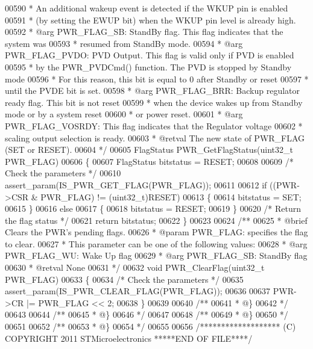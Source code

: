 \begin{DoxyCode}
00590 \textcolor{comment}{  *                  An additional wakeup event is detected if the WKUP pin is enabled }
00591 \textcolor{comment}{  *                  (by setting the EWUP bit) when the WKUP pin level is already high.  }
00592 \textcolor{comment}{  *            @arg PWR\_FLAG\_SB: StandBy flag. This flag indicates that the system was}
00593 \textcolor{comment}{  *                  resumed from StandBy mode.    }
00594 \textcolor{comment}{  *            @arg PWR\_FLAG\_PVDO: PVD Output. This flag is valid only if PVD is enabled }
00595 \textcolor{comment}{  *                  by the PWR\_PVDCmd() function. The PVD is stopped by Standby mode }
00596 \textcolor{comment}{  *                  For this reason, this bit is equal to 0 after Standby or reset}
00597 \textcolor{comment}{  *                  until the PVDE bit is set.}
00598 \textcolor{comment}{  *            @arg PWR\_FLAG\_BRR: Backup regulator ready flag. This bit is not reset }
00599 \textcolor{comment}{  *                  when the device wakes up from Standby mode or by a system reset }
00600 \textcolor{comment}{  *                  or power reset.  }
00601 \textcolor{comment}{  *            @arg PWR\_FLAG\_VOSRDY: This flag indicates that the Regulator voltage }
00602 \textcolor{comment}{  *                 scaling output selection is ready. }
00603 \textcolor{comment}{  * @retval The new state of PWR\_FLAG (SET or RESET).}
00604 \textcolor{comment}{  */}
00605 FlagStatus PWR_GetFlagStatus(uint32\_t PWR\_FLAG)
00606 \{
00607   FlagStatus bitstatus = RESET;
00608 
00609   \textcolor{comment}{/* Check the parameters */}
00610   assert_param(IS\_PWR\_GET\_FLAG(PWR\_FLAG));
00611 
00612   \textcolor{keywordflow}{if} ((PWR->CSR & PWR\_FLAG) != (uint32\_t)RESET)
00613   \{
00614     bitstatus = SET;
00615   \}
00616   \textcolor{keywordflow}{else}
00617   \{
00618     bitstatus = RESET;
00619   \}
00620   \textcolor{comment}{/* Return the flag status */}
00621   \textcolor{keywordflow}{return} bitstatus;
00622 \}
00623 
00624 \textcolor{comment}{/**}
00625 \textcolor{comment}{  * @brief  Clears the PWR's pending flags.}
00626 \textcolor{comment}{  * @param  PWR\_FLAG: specifies the flag to clear.}
00627 \textcolor{comment}{  *          This parameter can be one of the following values:}
00628 \textcolor{comment}{  *            @arg PWR\_FLAG\_WU: Wake Up flag}
00629 \textcolor{comment}{  *            @arg PWR\_FLAG\_SB: StandBy flag}
00630 \textcolor{comment}{  * @retval None}
00631 \textcolor{comment}{  */}
00632 \textcolor{keywordtype}{void} PWR_ClearFlag(uint32\_t PWR\_FLAG)
00633 \{
00634   \textcolor{comment}{/* Check the parameters */}
00635   assert_param(IS\_PWR\_CLEAR\_FLAG(PWR\_FLAG));
00636 
00637   PWR->CR |=  PWR\_FLAG << 2;
00638 \}
00639 
00640 \textcolor{comment}{/**}
00641 \textcolor{comment}{  * @\}}
00642 \textcolor{comment}{  */}
00643 
00644 \textcolor{comment}{/**}
00645 \textcolor{comment}{  * @\}}
00646 \textcolor{comment}{  */}
00647 
00648 \textcolor{comment}{/**}
00649 \textcolor{comment}{  * @\}}
00650 \textcolor{comment}{  */}
00651 
00652 \textcolor{comment}{/**}
00653 \textcolor{comment}{  * @\}}
00654 \textcolor{comment}{  */}
00655 
00656 \textcolor{comment}{/******************* (C) COPYRIGHT 2011 STMicroelectronics *****END OF FILE****/}
\end{DoxyCode}
